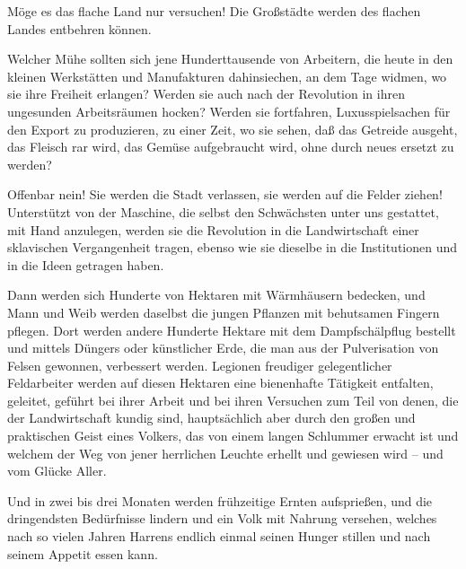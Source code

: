 \documentclass{scrbook}
\begin{document}
Möge es das flache Land nur versuchen! Die Großstädte werden des flachen Landes entbehren können.

Welcher Mühe sollten sich jene Hunderttausende von Arbeitern, die heute in den kleinen Werkstätten und Manufakturen dahinsiechen, an dem Tage widmen, wo sie ihre Freiheit erlangen? Werden sie auch nach der Revolution in ihren ungesunden Arbeitsräumen hocken? Werden sie fortfahren, Luxusspielsachen für den Export zu produzieren, zu einer Zeit, wo sie sehen, daß das Getreide ausgeht, das Fleisch rar wird, das Gemüse aufgebraucht wird, ohne durch neues ersetzt zu werden?

Offenbar nein! Sie werden die Stadt verlassen, sie werden auf die Felder ziehen! Unterstützt von der Maschine, die selbst den Schwächsten unter uns gestattet, mit Hand anzulegen, werden sie die Revolution in die Landwirtschaft einer sklavischen Vergangenheit tragen, ebenso wie sie dieselbe in die Institutionen und in die Ideen getragen haben.

Dann werden sich Hunderte von Hektaren mit Wärmhäusern bedecken, und Mann und Weib werden daselbst die jungen Pflanzen mit behutsamen Fingern pflegen. Dort werden andere Hunderte Hektare mit dem Dampfschälpflug bestellt und mittels Düngers oder künstlicher Erde, die man aus der Pulverisation von Felsen gewonnen, verbessert werden. Legionen freudiger gelegentlicher Feldarbeiter werden auf diesen Hektaren eine bienenhafte Tätigkeit entfalten, geleitet, geführt bei ihrer Arbeit und bei ihren Versuchen zum Teil von denen, die der Landwirtschaft kundig sind, hauptsächlich aber durch den großen und praktischen Geist eines Volkers, das von einem langen Schlummer erwacht ist und welchem der Weg von jener herrlichen Leuchte erhellt und gewiesen wird – und vom Glücke Aller.

Und in zwei bis drei Monaten werden frühzeitige Ernten aufsprießen, und die dringendsten Bedürfnisse lindern und ein Volk mit Nahrung versehen, welches nach so vielen Jahren Harrens endlich einmal seinen Hunger stillen und nach seinem Appetit essen kann.
\end{document}
